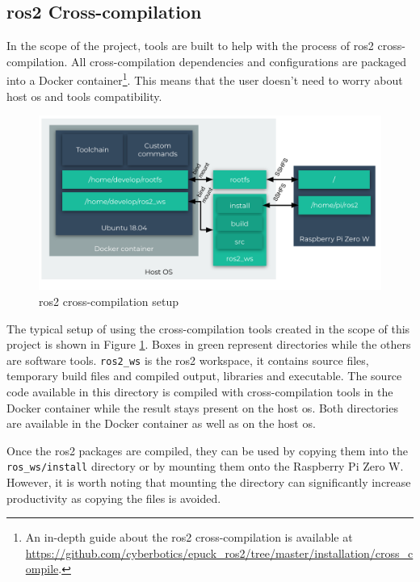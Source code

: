 \subsection{\ac{ros2} Cross-compilation}
In the scope of the project, tools are built to help with the process of \ac{ros2} cross-compilation.
All cross-compilation dependencies and configurations are packaged into a Docker container\footnote{An in-depth guide about the \ac{ros2} cross-compilation is available at \url{https://github.com/cyberbotics/epuck_ros2/tree/master/installation/cross_compile}.}.
This means that the user doesn't need to worry about host \ac{os} and tools compatibility. 

\begin{figure}[H]
    \centering
    \includegraphics[width=\textwidth]{physical/figures/cross_compilation.pdf}
    \caption{\ac{ros2} cross-compilation setup}
    \label{fig:physical:cross_compilation}
\end{figure}

The typical setup of using the cross-compilation tools created in the scope of this project is shown in Figure \ref{fig:physical:cross_compilation}.
Boxes in green represent directories while the others are software tools.
\texttt{ros2\_ws} is the \ac{ros2} workspace, it contains source files, temporary build files and compiled output, libraries and executable.
The source code available in this directory is compiled with cross-compilation tools in the Docker container while the result stays present on the host \ac{os}.
Both directories are available in the Docker container as well as on the host \ac{os}.

Once the \ac{ros2} packages are compiled, they can be used by copying them into the \texttt{ros\_ws/install} directory or by mounting them onto the Raspberry Pi Zero W.
However, it is worth noting that mounting the directory can significantly increase productivity as copying the files is avoided.

